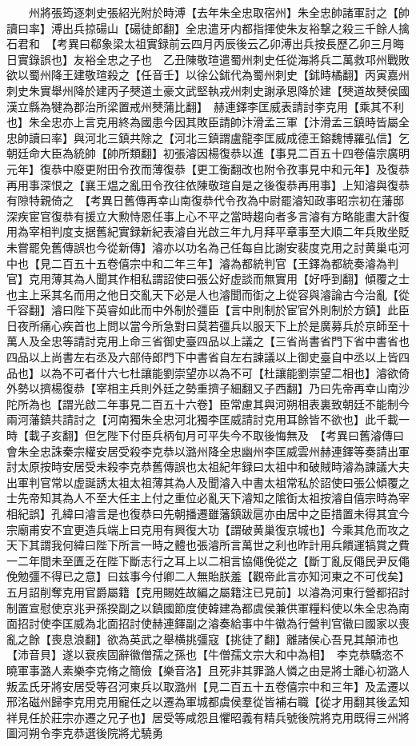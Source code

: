 　　州將張筠逐刺史張紹光附於時溥【去年朱全忠取宿州】朱全忠帥諸軍討之【帥讀曰率】溥出兵掠碭山【碭徒郎翻】全忠遣牙内都指揮使朱友裕撃之殺三千餘人擒石君和　【考異曰郗象梁太祖實録前云四月丙辰後云乙卯溥出兵按長歷乙卯三月晦日實錄誤也】友裕全忠之子也　乙丑陳敬瑄遣蜀州刺史任從海將兵二萬救邛州戰敗欲以蜀州降王建敬瑄殺之【任音壬】以徐公鉥代為蜀州刺史【鉥時橘翻】丙寅嘉州刺史朱實舉州降於建丙子僰道土豪文武堅執戎州刺史謝承恩降於建【僰道故僰侯國漢立縣為犍為郡治所梁置戒州僰蒲比翻】　赫連鐸李匡威表請討李克用【乘其不利也】朱全忠亦上言克用終為國患今因其敗臣請帥汴滑孟三軍【汴滑孟三鎮時皆屬全忠帥讀曰率】與河北三鎮共除之【河北三鎮謂盧龍李匡威成德王鎔魏博羅弘信】乞朝廷命大臣為統帥【帥所類翻】初張濬因楊復恭以進【事見二百五十四卷僖宗廣明元年】復恭中廢更附田令孜而薄復恭【更工衡翻改也附令孜事見中和元年】及復恭再用事深恨之【襄王煴之亂田令孜往依陳敬瑄自是之後復恭再用事】上知濬與復恭有隙特親倚之　【考異日舊傳再幸山南復恭代令孜為中尉罷濬知政事昭宗初在藩邸深疾宦官復恭有援立大勲恃恩任事上心不平之當時趨向者多言濬有方略能畫大計復用為宰相判度支据舊紀實録新紀表濬自光啟三年九月拜平章事至大順二年兵敗坐貶未嘗罷免舊傳誤也今從新傳】濬亦以功名為己任每自比謝安裴度克用之討黄巢屯河中也【見二百五十五卷僖宗中和二年三年】濬為都統判官【王鐸為都統奏濬為判官】克用薄其為人聞其作相私謂詔使曰張公好虚談而無實用【好呼到翻】傾覆之士也主上采其名而用之他日交亂天下必是人也濬聞而衘之上從容與濬論古今治亂【從千容翻】濬曰陛下英睿如此而中外制於彊臣【言中則制於宦官外則制於方鎮】此臣日夜所痛心疾首也上問以當今所急對曰莫若彊兵以服天下上於是廣募兵於京師至十萬人及全忠等請討克用上命三省御史臺四品以上議之【三省尚書省門下省中書省也四品以上尚書左右丞及六部侍郎門下中書省自左右諫議以上御史臺自中丞以上皆四品也】以為不可者什六七杜讓能劉崇望亦以為不可【杜讓能劉崇望二相也】濬欲倚外勢以擠楊復恭【宰相主兵則外廷之勢重擠子細翻又子西翻】乃曰先帝再幸山南沙陀所為也【謂光啟二年事見二百五十六卷】臣常慮其與河朔相表裏致朝廷不能制今兩河藩鎮共請討之【河南獨朱全忠河北獨李匡威請討克用耳餘皆不欲也】此千載一時【載子亥翻】但乞陛下付臣兵柄旬月可平失今不取後悔無及　【考異曰舊濬傳曰會朱全忠誅秦宗權安居受殺李克恭以潞州降全忠幽州李匡威雲州赫連鐸等奏請出軍討太原按時安居受未殺李克恭舊傳誤也太祖紀年録曰太祖中和破賊時濬為諫議大夫出軍判官常以虚誕誘太祖太祖薄其為人及聞濬入中書太祖常私於詔使曰張公傾覆之士先帝知其為人不至大任主上付之重位必亂天下濬知之隂衘太祖按濬自僖宗時為宰相紀誤】孔緯曰濬言是也復恭曰先朝播遷雖藩鎮跋扈亦由居中之臣措置未得其宜今宗廟甫安不宜更造兵端上曰克用有興復大功【謂破黄巢復京城也】今乘其危而攻之天下其謂我何緯曰陛下所言一時之體也張濬所言萬世之利也昨計用兵饋運犒賞之費一二年間未至匱乏在陛下斷志行之耳上以二相言協僶俛從之【斷丁亂反僶民尹反僶俛勉彊不得已之意】曰兹事今付卿二人無貽朕羞【觀帝此言亦知河東之不可伐矣】五月詔削奪克用官爵屬籍【克用賜姓故編之屬籍注已見前】以濬為河東行營都招討制置宣慰使京兆尹孫揆副之以鎮國節度使韓建為都虞侯兼供軍糧料使以朱全忠為南面招討使李匡威為北面招討使赫連鐸副之濬奏給事中牛徽為行營判官徽曰國家以喪亂之餘【喪息浪翻】欲為英武之舉横挑彊寇【挑徒了翻】離諸侯心吾見其顛沛也【沛音貝】遂以衰疾固辭徽僧孺之孫也【牛僧孺文宗大和中為相】　李克恭驕恣不曉軍事潞人素樂李克脩之簡儉【樂音洛】且死非其罪潞人憐之由是將士離心初潞人叛孟氏牙將安居受等召河東兵以取潞州【見二百五十五卷僖宗中和三年】及孟遷以邢洺磁州歸李克用克用寵任之以遷為軍城都虞侯羣從皆補右職【從才用翻其後孟知祥見任於莊宗亦遷之兄子也】居受等咸怨且懼昭義有精兵號後院將克用既得三州將圖河朔令李克恭選後院將尤驍勇